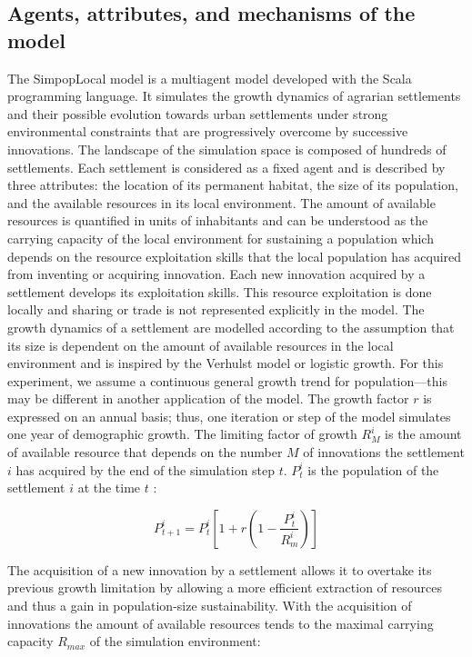 \subsection{Agents, attributes, and mechanisms of the model}
\label{subsec:mechanisms}

The SimpopLocal model is a multiagent model developed with the Scala programming language. It simulates the growth dynamics of agrarian settlements and their possible evolution towards urban settlements under strong environmental constraints that are progressively overcome by successive innovations. The landscape of the simulation space is composed of hundreds of settlements. Each settlement is considered as a fixed agent and is described by three attributes: the location of its permanent habitat, the size of its population, and the available resources in its local environment. The amount of available resources is quantified in units of inhabitants and can be understood as the carrying capacity of the local environment for sustaining a population which depends on the resource exploitation skills that the local population has acquired from inventing or acquiring innovation. Each new innovation acquired by a settlement develops its exploitation skills. This resource exploitation is done locally and sharing or trade is not represented explicitly in the model. The growth dynamics of a settlement are modelled according to the assumption that its size is dependent on the amount of available resources in the local environment and is inspired by the Verhulst model \autocite{Verhulst1845} or logistic growth. For this experiment, we assume a continuous general growth trend for population—this may be different in another application of the model. The growth factor $r$ is expressed on an annual basis; thus, one iteration or step of the model simulates one year of demographic growth. The limiting factor of growth $R^{i}_{M}$ is the amount of available resource that depends on the number $M$ of innovations the settlement $i$ has acquired by the end of the simulation step $t$. $P^{i}_{t}$ is the population of the settlement $i$ at the time $t$ :

\begin{equation}
P^{i}_{t+1} = P^{i}_{t} \left[ 1 + r  \left( 1 -  \frac{P^{i}_{t}} { R^{i}_{m} }\right)\right]
\end{equation}

The acquisition of a new innovation by a settlement allows it to overtake its previous growth limitation by allowing a more efficient extraction of resources and thus a gain in population-size sustainability. With the acquisition of innovations the amount of available resources tends to the maximal carrying capacity $R_{max}$ of the simulation environment:

